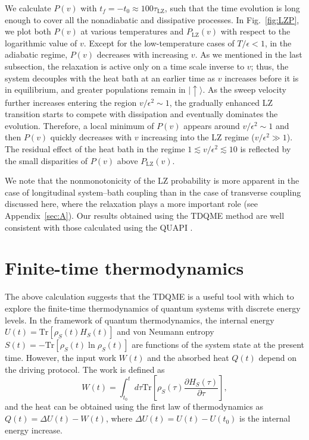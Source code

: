\documentclass[english,nofootinbib, pra, twocolumn,superscriptaddress]{revtex4-1}
\begin{document}
We calculate $P(v)$ with $t_{f}=-t_{0}\approx100\tau_{\text{LZ}}$,
such that the time evolution is long enough to cover all the nonadiabatic
and dissipative processes. In Fig.~\ref{fig:LZP}, we plot both $P(v)$
at various temperatures and $P_{\text{LZ}}(v)$ with respect to the logarithmic value of $v$. Except for the low-temperature
cases of $T/\epsilon<1$, in the adiabatic regime, $P(v)$ decreases
with increasing $v$. As we mentioned in the last subsection, the
relaxation is active only on a time scale inverse to $v$; thus, the system
decouples with the heat bath at an earlier time as $v$ increases before it is in equilibrium,
and greater populations remain in $\vert\uparrow\rangle$. As the sweep velocity further increases entering
the region $v/\epsilon^{2}\sim1$, the gradually enhanced LZ transition
starts to compete with dissipation and eventually dominates the evolution.
Therefore, a local minimum of $P(v)$ appears around $v/\epsilon^{2}\sim1$
and then $P(v)$ quickly decreases with $v$ increasing into the LZ regime
($v/\epsilon^{2}\gg1$). The residual effect of the heat bath in the regime $1\lesssim v/\epsilon^{2}\lesssim10$ is reflected by the small disparities of $P(v)$ above $P_{\text{LZ}}(v)$.

We note that the nonmonotonicity of the LZ probability
is more apparent in the case of longitudinal system--bath coupling than
in the case of transverse coupling discussed here, where the
relaxation plays a more important role (see Appendix~\ref{sec:A}). Our results obtained
using the TDQME method are well consistent with those calculated using the QUAPI \citep{2015.Thorwart}. 

\section{Finite-time thermodynamics}

The above calculation suggests that the TDQME is a useful tool with which to explore
the finite-time thermodynamics of quantum systems with discrete energy
levels. In the framework of quantum thermodynamics, the internal energy $U(t)=\textrm{Tr}\left[\rho_{S}(t)H_{S}(t)\right]$
and von Neumann entropy $S(t)=-\text{Tr}[\rho_{S}(t)\ln\rho_{S}(t)]$
are functions of the system state at the present time. However, the input work $W(t)$ and the absorbed heat $Q(t)$ depend on the driving protocol. The work is defined as
\begin{equation}
W(t)=\int_{t_{0}}^{t}d\tau\textrm{Tr}\left[\rho_{S}(\tau)\frac{\partial H_{S}(\tau)}{\partial\tau}\right],\label{eq:W}
\end{equation}
and the heat can be obtained using the first law of thermodynamics as $Q(t)=\Delta U(t)-W(t)$,
where $\Delta U(t)=U(t)-U(t_{0})$ is the internal energy increase. 
\end{document}
